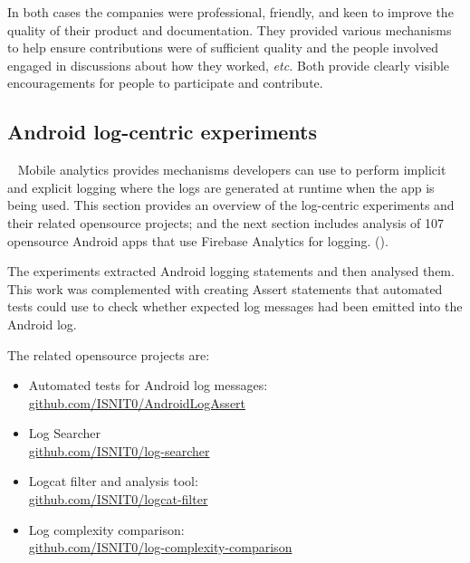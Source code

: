 In both cases the companies were professional, friendly, and keen to improve the quality of their product and documentation. They provided various mechanisms to help ensure contributions were of sufficient quality and the people involved engaged in discussions about how they worked, \emph{etc.} Both provide clearly visible encouragements for people to participate and contribute. 

\subsection{Android log-centric experiments}~\label{section-android-log-centric-experiments}
Mobile analytics provides mechanisms developers can use to perform implicit and explicit logging where the logs are generated at runtime when the app is being used. This section provides an overview of the log-centric experiments and their related opensource projects; and the next section includes analysis of 107 opensource Android apps that use Firebase Analytics for logging. (). 

The experiments extracted Android logging statements and then analysed them. This work was complemented with creating Assert statements that automated tests could use to check whether expected log messages had been emitted into the Android log.

The related opensource projects are:
\begin{itemize}
    \itemsep0em
    \item Automated tests for Android log messages: \\ \href{https://github.com/ISNIT0/AndroidLogAssert}{github.com/ISNIT0/AndroidLogAssert}
    \item Log Searcher \\ \href{https://github.com/ISNIT0/log-searcher}{github.com/ISNIT0/log-searcher}
    \item Logcat filter and analysis tool: \\ \href{https://github.com/ISNIT0/logcat-filter}{github.com/ISNIT0/logcat-filter}
    \item Log complexity comparison: \\ \href{https://github.com/ISNIT0/log-complexity-comparison}{github.com/ISNIT0/log-complexity-comparison}
\end{itemize}


